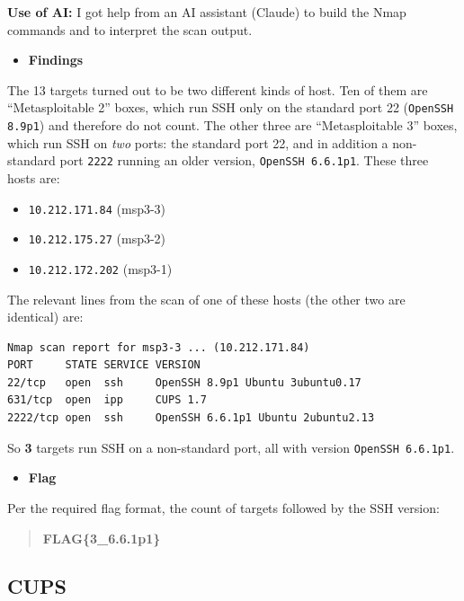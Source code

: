 \documentclass[11pt]{article}
\begin{document}
\noindent \textbf{Use of AI:} I got help from an AI assistant (Claude) to build the Nmap commands and to interpret the scan output.

\begin{itemize}[leftmargin=1.5em]
    \item \textbf{Findings}
\end{itemize}
\noindent The 13 targets turned out to be two different kinds of host. Ten of them are ``Metasploitable 2'' boxes, which run SSH only on the standard port 22 (\texttt{OpenSSH 8.9p1}) and therefore do not count. The other three are ``Metasploitable 3'' boxes, which run SSH on \emph{two} ports: the standard port 22, and in addition a non-standard port \texttt{2222} running an older version, \texttt{OpenSSH 6.6.1p1}. These three hosts are:

\begin{itemize}[leftmargin=2.2em]
    \item \texttt{10.212.171.84} (msp3-3)
    \item \texttt{10.212.175.27} (msp3-2)
    \item \texttt{10.212.172.202} (msp3-1)
\end{itemize}

\noindent The relevant lines from the scan of one of these hosts (the other two are identical) are:

\begin{verbatim}
Nmap scan report for msp3-3 ... (10.212.171.84)
PORT     STATE SERVICE VERSION
22/tcp   open  ssh     OpenSSH 8.9p1 Ubuntu 3ubuntu0.17
631/tcp  open  ipp     CUPS 1.7
2222/tcp open  ssh     OpenSSH 6.6.1p1 Ubuntu 2ubuntu2.13
\end{verbatim}

\noindent So \textbf{3} targets run SSH on a non-standard port, all with version \texttt{OpenSSH 6.6.1p1}.

\begin{itemize}[leftmargin=1.5em]
    \item \textbf{Flag}
\end{itemize}
\noindent Per the required flag format, the count of targets followed by the SSH version:

\begin{quote}
\textbf{FLAG\{3\_6.6.1p1\}}
\end{quote}

\subsection{CUPS}
\end{document}
